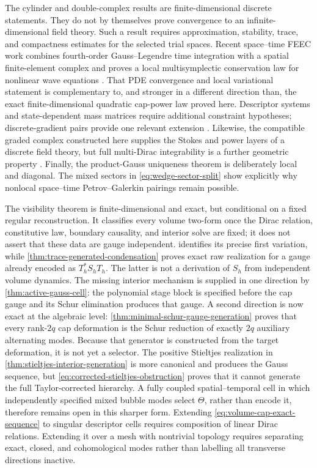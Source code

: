 \documentclass[11pt,a4paper]{article}
\begin{document}
The cylinder and double-complex results are finite-dimensional discrete
statements.  They do not by themselves prove convergence to an
infinite-dimensional field theory.  Such a result requires approximation,
stability, trace, and compactness estimates for the selected trial spaces.
Recent space--time FEEC work combines fourth-order Gauss--Legendre time
integration with a spatial finite-element complex and proves a local
multisymplectic conservation law for nonlinear wave equations
\cite{cheng2026}.  That PDE convergence and local variational statement is
complementary to, and stronger in a different direction than, the exact
finite-dimensional quadratic cap-power law proved here.
Descriptor systems and state-dependent mass matrices require additional
constraint hypotheses; discrete-gradient pairs provide one relevant
extension \cite{schulze2023}.  Likewise, the compatible graded complex
constructed here supplies the Stokes and power layers of a discrete field
theory, but full multi-Dirac integrability is a further geometric property
\cite{vankerschaver2012}.  Finally, the product-Gauss uniqueness theorem is
deliberately local and diagonal.  The mixed sectors in
\cref{eq:wedge-sector-split} show explicitly why nonlocal space--time
Petrov--Galerkin pairings remain possible.

The visibility theorem is finite-dimensional and exact, but conditional
on a fixed regular reconstruction.  It classifies every volume two-form once the
Dirac relation, constitutive law, boundary causality, and interior solve
are fixed; it does not assert that these data are gauge independent.
 identifies its precise first variation,
while \cref{thm:trace-generated-condensation} proves exact raw realization
for a gauge already encoded as \(T_h^*S_hT_h\).  The latter is not a
derivation of \(S_h\) from independent volume dynamics.  The missing
interior mechanism is supplied in one direction by
\cref{thm:active-gauss-cell}: the polynomial stage block is specified
before the cap gauge and its Schur elimination produces that gauge.  A
second direction is now exact at the algebraic level:
\cref{thm:minimal-schur-gauge-generation} proves that every rank-\(2q\)
cap deformation is the Schur reduction of exactly \(2q\) auxiliary
alternating modes.  Because that generator is constructed from the target
deformation, it is not yet a selector.  The positive Stieltjes realization
in \cref{thm:stieltjes-interior-generation} is more canonical and produces
the Gauss sequence, but \cref{eq:corrected-stieltjes-obstruction} proves
that it cannot generate the full Taylor-corrected hierarchy.  A fully
coupled spatial--temporal cell in which independently specified mixed
bubble modes select \(\Theta\), rather than encode it, therefore remains
open in this sharper form.
Extending \cref{eq:volume-cap-exact-sequence} to singular descriptor cells
requires composition of linear Dirac relations.  Extending it over a
mesh with nontrivial topology requires separating exact, closed, and
cohomological modes rather than labelling all transverse directions
inactive.
\end{document}
